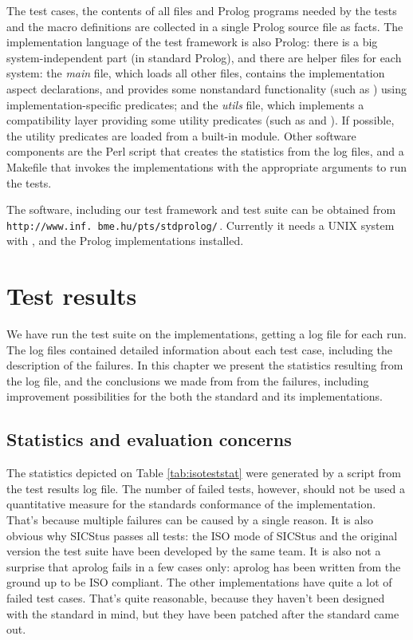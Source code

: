 \documentclass[draft]{llncs}%
\begin{document}
The test cases, the contents of all files and Prolog programs needed by the
tests and the macro definitions are collected in a single Prolog source file
as facts. The implementation language of the test framework is also Prolog:
there is a big system-independent part (in standard Prolog),
and there are helper files
for each system: the \emph{main} file, which loads all other files,
contains the implementation aspect declarations, and provides some
nonstandard functionality (such as )
using implementation-specific predicates; and the \emph{utils} file, which
implements a compatibility layer providing some utility predicates (such as
 and ). If
possible, the utility predicates are loaded from a built-in module.
Other software components are the Perl
script that creates the statistics from the log files, and a Makefile
that invokes the implementations with the appropriate arguments to run the
tests.

The software, including our test framework and test suite can be obtained
from \texttt{http://www.\allowbreak inf\allowbreak .\allowbreak
bme.hu/\homedir pts/stdprolog/}\,. Currently it needs a UNIX system with
,  and the Prolog implementations installed.

\section{Test results}

We have run the test suite on the implementations, getting a log file for
each run. The log files contained detailed information about each test case,
including the description of the failures. In this chapter we present the
statistics resulting from the log file, and the conclusions we made from from
the failures, including improvement possibilities for the both the standard
and its implementations.

\subsection{Statistics and evaluation concerns}

The statistics depicted on Table \ref{tab:isoteststat}
were generated by a script from the test results log file. The number of
failed tests, however, should not be used a quantitative measure for the
standards conformance of the implementation. That's because multiple failures
can be caused by a single reason. It is also obvious why SICStus passes all
tests: the ISO mode of SICStus
and the original version the test suite have been developed by the same team.
It is also not a surprise that aprolog fails in a few cases only: aprolog has
been written from the ground up to be ISO compliant. The other
implementations have quite a lot of failed test cases. That's quite
reasonable, because they haven't been designed with the standard in mind,
but they have been patched after the standard came out.
\end{document}
